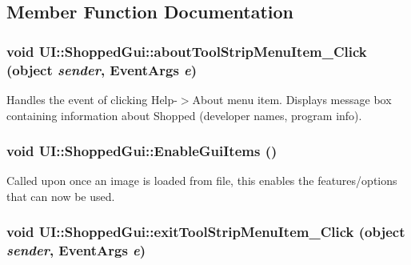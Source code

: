 \subsection{Member Function Documentation}
\hypertarget{class_u_i_1_1_shopped_gui_a04958c8af963e508601e03e14bfb8bb8}{
\subsubsection[{aboutToolStripMenuItem\_\-Click}]{\setlength{\rightskip}{0pt plus 5cm}void UI::ShoppedGui::aboutToolStripMenuItem\_\-Click (object {\em sender}, \/  EventArgs {\em e})}}
\label{class_u_i_1_1_shopped_gui_a04958c8af963e508601e03e14bfb8bb8}
Handles the event of clicking Help-\/$>$About menu item. Displays message box containing information about Shopped (developer names, program info). \hypertarget{class_u_i_1_1_shopped_gui_a190bba777e57891c8042b86afbba83c6}{
\subsubsection[{EnableGuiItems}]{\setlength{\rightskip}{0pt plus 5cm}void UI::ShoppedGui::EnableGuiItems ()}}
\label{class_u_i_1_1_shopped_gui_a190bba777e57891c8042b86afbba83c6}
Called upon once an image is loaded from file, this enables the features/options that can now be used. \hypertarget{class_u_i_1_1_shopped_gui_a4c3239cc225d230bafb0cc53a9f49e2c}{
\subsubsection[{exitToolStripMenuItem\_\-Click}]{\setlength{\rightskip}{0pt plus 5cm}void UI::ShoppedGui::exitToolStripMenuItem\_\-Click (object {\em sender}, \/  EventArgs {\em e})}}
